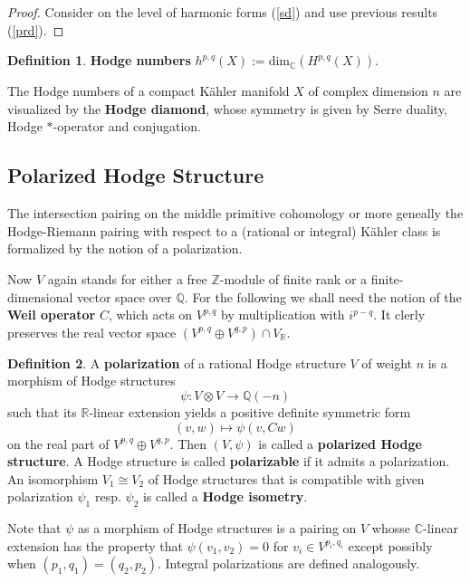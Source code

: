 \documentclass{article}
\theoremstyle{definition}
\newtheorem{definition}{Definition}[subsection]
\theoremstyle{plain}
\begin{document}
\begin{proof}
    Consider on the level of harmonic forms (\ref{sd}) and use previous results (\ref{prd}).
\end{proof}

\begin{definition}
    \textbf{Hodge numbers} $ h^{p,q}(X):=\mathrm{dim}_{\mathbb{C}}(H^{p,q}(X)) $.
\end{definition}

The Hodge numbers of a compact K\"{a}hler manifold $ X $ of complex dimension $ n $ are visualized by the \textbf{Hodge diamond}, whose symmetry is given by Serre duality, Hodge $ * $-operator and conjugation.

\subsection{Polarized Hodge Structure}

The intersection pairing on the middle primitive cohomology or more geneally the Hodge-Riemann pairing with respect to a (rational or integral) K\"{a}hler class is formalized by the notion of a polarization.

Now $ V $ again stands for either a free $ \mathbb{Z} $-module of finite rank or a finite-dimensional vector space over $ \mathbb{Q} $. For the following we shall need the notion of the \textbf{Weil operator} $ C $, which acts on $ V^{p,q} $ by multiplication with $ i^{p-q} $. It clerly preserves the real vector space $ (V^{p,q}\oplus V^{q,p})\cap V_{\mathbb{R}} $.

\begin{definition}
    A \textbf{polarization} of a rational Hodge structure $ V $ of weight $ n $ is a morphism of Hodge structures\[
        \psi:V\otimes V\longrightarrow \mathbb{Q}(-n)
    \]such that its $ \mathbb{R} $-linear extension yields a positive definite symmetric form\[
        (v,w)\longmapsto \psi(v,Cw)
    \]on the real part of $ V^{p,q}\oplus V^{q,p} $. Then $ (V,\psi) $ is called a \textbf{polarized Hodge structure}. A Hodge structure is called \textbf{polarizable} if it admits a polarization. An isomorphism $ V_1\cong V_2 $ of Hodge structures that is compatible with given polarization $ \psi_1 $ resp. $ \psi_2 $ is called a \textbf{Hodge isometry}.
\end{definition}
Note that $ \psi $ as a morphism of Hodge structures is a  pairing on $ V $ whosse $ \mathbb{C} $-linear extension has the property that $ \psi(v_1,v_2)=0 $ for $ v_i\in V^{p_i,q_i} $ except possibly when $ (p_1,q_1)=(q_2,p_2) $. Integral polarizations are defined analogously.
\end{document}
